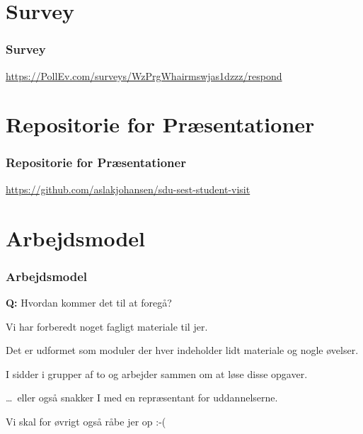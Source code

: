 \section{Survey}
\begin{frame}
    \frametitle{Survey}
    \begin{center}
    
      \vspace{4mm}
      \url{https://PollEv.com/surveys/WzPrgWhairmswjas1dzzz/respond}
    \end{center}
\end{frame}


\section{Repositorie for Præsentationer}
\begin{frame}
    \frametitle{Repositorie for Præsentationer}
    \begin{center}
      \url{https://github.com/aslakjohansen/sdu-sest-student-visit}
    \end{center}
\end{frame}

\section{Arbejdsmodel}
\begin{frame}
  \frametitle{Arbejdsmodel}
  \vspace{3mm}
  \textbf{Q:} Hvordan kommer det til at foregå?
  
  \pause
  \vspace{5mm}
  Vi har forberedt noget fagligt materiale til jer.
  
  \vspace{5mm}
  Det er udformet som moduler der hver indeholder lidt materiale og nogle øvelser.
  
  \vspace{5mm}
  I sidder i grupper af to og arbejder sammen om at løse disse opgaver.
  
  \pause
  \vspace{5mm}
  \ldots\ eller også snakker I med en repræsentant for uddannelserne.
  
  \pause
  \vspace{5mm}
  Vi skal for øvrigt også råbe jer op :-(
\end{frame}

